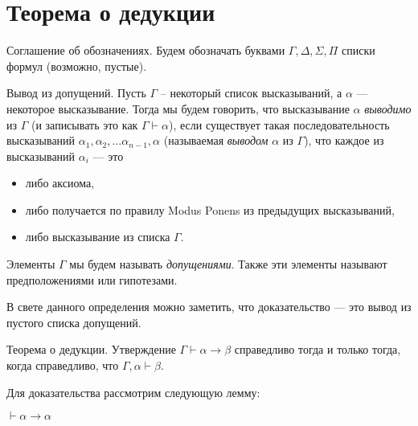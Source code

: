 \section{Теорема о дедукции}

Соглашение об обозначениях. Будем обозначать буквами 
$\Gamma, \Delta, \Sigma, \Pi$ списки формул (возможно, пустые).

\begin{definition}{Вывод из допущений.}
Пусть $\Gamma$ -- некоторый список высказываний, а $\alpha$ --- 
некоторое высказывание. 
Тогда мы будем говорить, что высказывание $\alpha$ \emph{выводимо} из $\Gamma$ 
(и записывать это как $\Gamma \vdash \alpha$), если существует такая 
последовательность высказываний $\alpha_1, \alpha_2, \dots \alpha_{n-1}, \alpha$
(называемая \emph{выводом} $\alpha$ из $\Gamma$), 
что каждое из высказываний $\alpha_i$ --- это 
\begin{itemize}
\item либо аксиома,
\vspace{-0.2cm}
\item либо получается по правилу Modus Ponens из предыдущих высказываний, 
\vspace{-0.2cm}
\item либо высказывание из списка $\Gamma$.
\end{itemize}
Элементы $\Gamma$ мы будем называть \emph{допущениями}. Также эти элементы
называют предположениями или гипотезами. 
\end{definition}

В свете данного определения можно заметить, что доказательство --- это
вывод из пустого списка допущений. 

\begin{theorem}\label{deduction_theorem}{Теорема о дедукции.}
Утверждение $\Gamma \vdash \alpha \rightarrow \beta$ справедливо тогда и 
только тогда, когда справедливо, что $\Gamma, \alpha \vdash \beta$.
\end{theorem}

Для доказательства рассмотрим следующую лемму:

\begin{lemma}
$\vdash \alpha \rightarrow \alpha$
\end{lemma}


